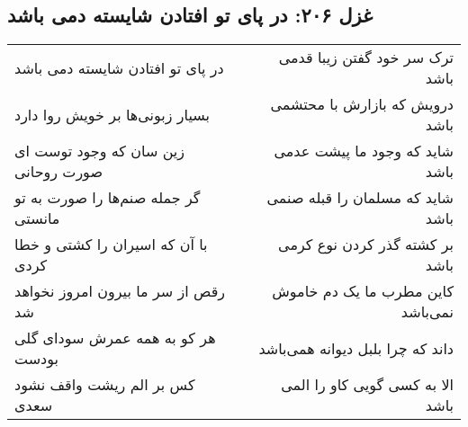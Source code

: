 \begin{center}
\section*{غزل ۲۰۶: در پای تو افتادن شایسته دمی باشد}
\label{sec:206}
\begin{longtable}{l p{0.5cm} r}
در پای تو افتادن شایسته دمی باشد
&&
ترک سر خود گفتن زیبا قدمی باشد
\\
بسیار زبونی‌ها بر خویش روا دارد
&&
درویش که بازارش با محتشمی باشد
\\
زین سان که وجود توست ای صورت روحانی
&&
شاید که وجود ما پیشت عدمی باشد
\\
گر جمله صنم‌ها را صورت به تو مانستی
&&
شاید که مسلمان را قبله صنمی باشد
\\
با آن که اسیران را کشتی و خطا کردی
&&
بر کشته گذر کردن نوع کرمی باشد
\\
رقص از سر ما بیرون امروز نخواهد شد
&&
کاین مطرب ما یک دم خاموش نمی‌باشد
\\
هر کو به همه عمرش سودای گلی بودست
&&
داند که چرا بلبل دیوانه همی‌باشد
\\
کس بر الم ریشت واقف نشود سعدی
&&
الا به کسی گویی کاو را المی باشد
\\
\end{longtable}
\end{center}

